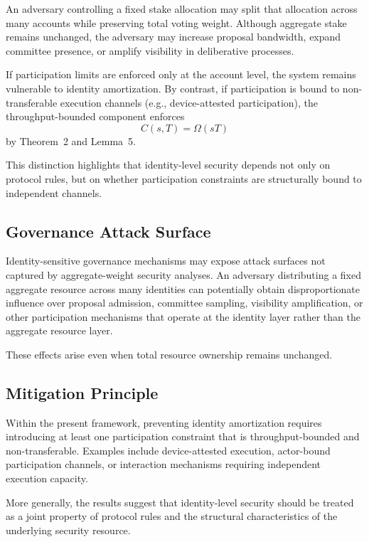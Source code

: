 \documentclass[journal]{IEEEtran}
\begin{document}
	An adversary controlling a fixed stake allocation may split
	that allocation across many accounts while preserving total
	voting weight.
	Although aggregate stake remains unchanged, the adversary
	may increase proposal bandwidth, expand committee presence,
	or amplify visibility in deliberative processes.
	
	If participation limits are enforced only at the account level,
	the system remains vulnerable to identity amortization.
	By contrast, if participation is bound to non-transferable
	execution channels (e.g., device-attested participation),
	the throughput-bounded component enforces
	\[
	C(s,T)=\Omega(sT)
	\]
	by Theorem~2 and Lemma~5.
	
	This distinction highlights that identity-level security depends
	not only on protocol rules, but on whether participation
	constraints are structurally bound to independent channels.
	
	\subsection{Governance Attack Surface}
	
	Identity-sensitive governance mechanisms may expose attack
	surfaces not captured by aggregate-weight security analyses.
	An adversary distributing a fixed aggregate resource across
	many identities can potentially obtain disproportionate
	influence over proposal admission, committee sampling,
	visibility amplification, or other participation mechanisms
	that operate at the identity layer rather than the aggregate
	resource layer.
	
	These effects arise even when total resource ownership
	remains unchanged.
	
	\subsection{Mitigation Principle}
	
	Within the present framework, preventing identity
	amortization requires introducing at least one participation
	constraint that is throughput-bounded and non-transferable.
	Examples include device-attested execution,
	actor-bound participation channels,
	or interaction mechanisms requiring independent execution
	capacity.
	
	More generally, the results suggest that identity-level
	security should be treated as a joint property of protocol
	rules and the structural characteristics of the underlying
	security resource.
	
\end{document}
